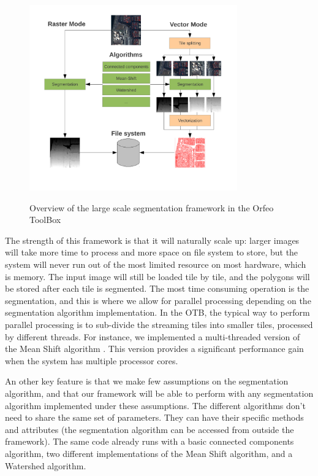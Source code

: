 \documentclass{josis}
\begin{document}
\begin{figure}[!htb]
\centering
\includegraphics[width=0.8\textwidth]{Pictures/schema_ogrs}\label{fig:overview}
\caption{Overview of the large scale segmentation framework in the Orfeo ToolBox}
\end{figure}

The strength of this framework is that it will naturally scale up:
larger images will take more time to process and more space on file
system to store, but the system will never run out of the most limited
resource on most hardware, which is memory. The input image will still
be loaded tile by tile, and the polygons will be stored after each
tile is segmented. The most time consuming operation is the
segmentation, and this is where we allow for parallel processing
depending on the segmentation algorithm implementation. In the OTB,
the typical way to perform parallel processing is to sub-divide the
streaming tiles into smaller tiles, processed by different
threads. For instance, we implemented a multi-threaded version of the
Mean Shift algorithm \cite{Comaniciu2002mean}. This version provides a
significant performance gain when the system has multiple processor
cores.

An other key feature is that we make few assumptions on the
segmentation algorithm, and that our framework will be able to perform
with any segmentation algorithm implemented under these
assumptions. The different algorithms don't need to share the same set
of parameters. They can have their specific methods and attributes
(the segmentation algorithm can be accessed from outside the
framework). The same code already runs with a basic connected
components algorithm, two different implementations of the Mean Shift
algorithm, and a Watershed algorithm.
\end{document}
